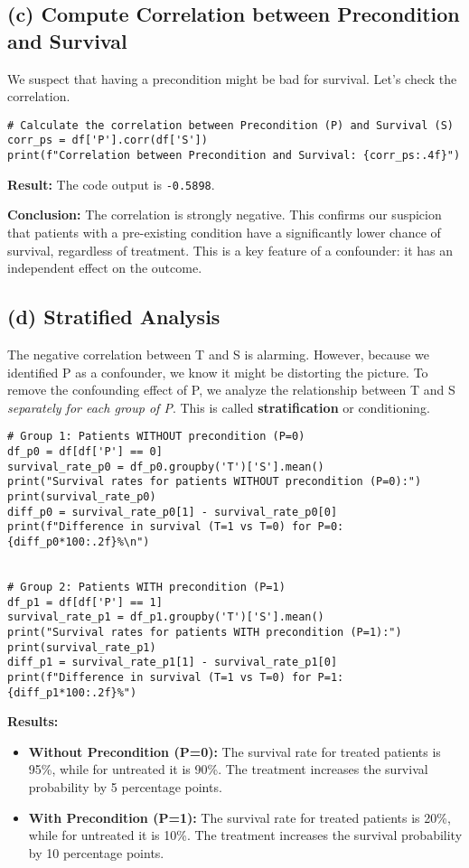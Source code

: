 \documentclass[11pt,a4paper]{article}
\begin{document}
\subsection{(c) Compute Correlation between Precondition and Survival}
We suspect that having a precondition might be bad for survival. Let's check the correlation.

\begin{lstlisting}
# Calculate the correlation between Precondition (P) and Survival (S)
corr_ps = df['P'].corr(df['S'])
print(f"Correlation between Precondition and Survival: {corr_ps:.4f}")
\end{lstlisting}
\textbf{Result:} The code output is \texttt{-0.5898}.

\textbf{Conclusion:} The correlation is strongly negative. This confirms our suspicion that patients with a pre-existing condition have a significantly lower chance of survival, regardless of treatment. This is a key feature of a confounder: it has an independent effect on the outcome.

\subsection{(d) Stratified Analysis}
The negative correlation between T and S is alarming. However, because we identified P as a confounder, we know it might be distorting the picture. To remove the confounding effect of P, we analyze the relationship between T and S \textit{separately for each group of P}. This is called \textbf{stratification} or conditioning.

\begin{lstlisting}
# Group 1: Patients WITHOUT precondition (P=0)
df_p0 = df[df['P'] == 0]
survival_rate_p0 = df_p0.groupby('T')['S'].mean()
print("Survival rates for patients WITHOUT precondition (P=0):")
print(survival_rate_p0)
diff_p0 = survival_rate_p0[1] - survival_rate_p0[0]
print(f"Difference in survival (T=1 vs T=0) for P=0: {diff_p0*100:.2f}%\n")


# Group 2: Patients WITH precondition (P=1)
df_p1 = df[df['P'] == 1]
survival_rate_p1 = df_p1.groupby('T')['S'].mean()
print("Survival rates for patients WITH precondition (P=1):")
print(survival_rate_p1)
diff_p1 = survival_rate_p1[1] - survival_rate_p1[0]
print(f"Difference in survival (T=1 vs T=0) for P=1: {diff_p1*100:.2f}%")
\end{lstlisting}

\textbf{Results:}
\begin{itemize}
    \item \textbf{Without Precondition (P=0):} The survival rate for treated patients is 95\%, while for untreated it is 90\%. The treatment increases the survival probability by 5 percentage points.
    \item \textbf{With Precondition (P=1):} The survival rate for treated patients is 20\%, while for untreated it is 10\%. The treatment increases the survival probability by 10 percentage points.
\end{itemize}
\end{document}
